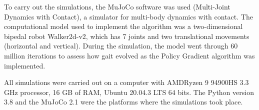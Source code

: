 To carry out the simulations, the MuJoCo software was used (Multi-Joint Dynamics with Contact), a simulator for multi-body dynamics with contact. The computational model used to implement the algorithm was a two-dimensional bipedal robot Walker2d-v2, which has 7 joints and two translational movements (horizontal and vertical). During the simulation, the model went through 60 million iterations to assess how gait evolved as the Policy Gradient algorithm was implemented.

All simulations were carried out on a computer with AMD\textregistered Ryzen 9 94900HS 3.3 GHz processor, 16 GB of RAM, Ubuntu 20.04.3 LTS 64 bits. The Python version 3.8 and the MuJoCo 2.1 were the platforms where the simulations took place.
